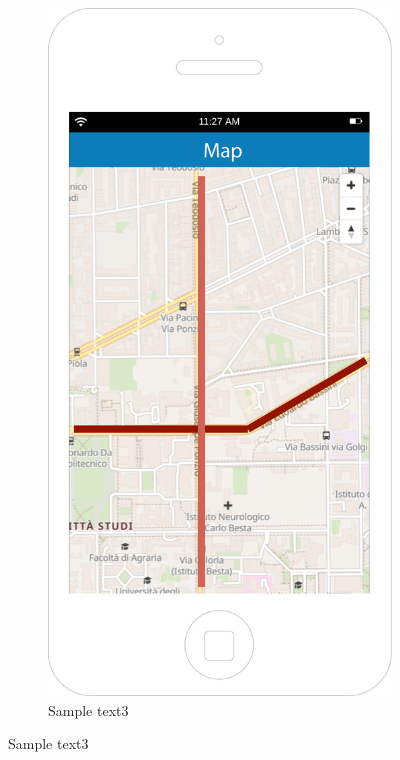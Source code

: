 \documentclass[12pt,a4paper]{report}
\begin{document}
		\begin{figure}
		\begin{subfigure}{0.5\textwidth}
		\setcounter{subfigure}{4}
			\includegraphics[scale=0.25, center]{Map}
			\caption{Sample text3}
			\label{fig:subim2}

\end{subfigure}
\end{figure}
\end{document}
